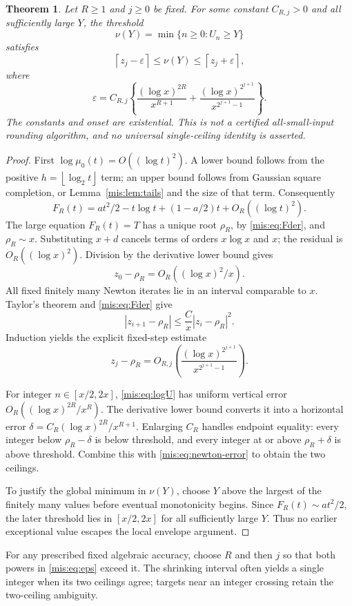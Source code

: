 \documentclass[11pt]{article}
\newtheorem{theorem}{Theorem}[section]
\theoremstyle{remark}\newtheorem{remark}[theorem]{Remark}
\newcommand{\ceil}[1]{\left\lceil #1\right\rceil}
\newcommand{\floor}[1]{\left\lfloor #1\right\rfloor}
\begin{document}
\begin{theorem}\label{mis:thm:inverse}
Let $R\ge1$ and $j\ge0$ be fixed. For some constant $C_{R,j}>0$ and all sufficiently large $Y$, the threshold
\[
 \nu(Y)=\min\{n\ge0:U_n\ge Y\}
\]
satisfies
\begin{equation}\label{mis:eq:ceilings}
 \ceil{z_j-\varepsilon}\le\nu(Y)\le\ceil{z_j+\varepsilon},
\end{equation}
where
\begin{equation}\label{mis:eq:eps}
 \varepsilon=C_{R,j}\left\{
   \frac{(\log x)^{2R}}{x^{R+1}}+
   \frac{(\log x)^{2^{j+1}}}{x^{2^{j+1}-1}}\right\}.
\end{equation}
The constants and onset are existential. This is not a certified all-small-input rounding algorithm, and no universal single-ceiling identity is asserted.
\end{theorem}
\begin{proof}
First $\log\mu_0(t)=O((\log t)^2)$. A lower bound follows from the positive $h=\floor{\log_2t}$ term; an upper bound follows from Gaussian square completion, or Lemma~\ref{mis:lem:tails} and the size of that term. Consequently
\[
 F_R(t)=at^2/2-t\log t+(1-a/2)t+O_R((\log t)^2).
\]
The large equation $F_R(t)=T$ has a unique root $\rho_R$, by \eqref{mis:eq:Fder}, and $\rho_R\sim x$. Substituting $x+d$ cancels terms of orders $x\log x$ and $x$; the residual is $O_R((\log x)^2)$. Division by the derivative lower bound gives
\[
 z_0-\rho_R=O_R((\log x)^2/x).
\]
All fixed finitely many Newton iterates lie in an interval comparable to $x$. Taylor's theorem and \eqref{mis:eq:Fder} give
\[
 |z_{i+1}-\rho_R|\le\frac Cx|z_i-\rho_R|^2.
\]
Induction yields the explicit fixed-step estimate
\begin{equation}\label{mis:eq:newton-error}
 z_j-\rho_R=O_{R,j}\left(
       \frac{(\log x)^{2^{j+1}}}{x^{2^{j+1}-1}}\right).
\end{equation}

For integer $n\in[x/2,2x]$, \eqref{mis:eq:logU} has uniform vertical error $O_R((\log x)^{2R}/x^R)$. The derivative lower bound converts it into a horizontal error
$\delta=C_R(\log x)^{2R}/x^{R+1}$. Enlarging $C_R$ handles endpoint equality: every integer below $\rho_R-\delta$ is below threshold, and every integer at or above $\rho_R+\delta$ is above threshold. Combine this with \eqref{mis:eq:newton-error} to obtain the two ceilings.

To justify the global minimum in $\nu(Y)$, choose $Y$ above the largest of the finitely many values before eventual monotonicity begins. Since $F_R(t)\sim at^2/2$, the later threshold lies in $[x/2,2x]$ for all sufficiently large $Y$. Thus no earlier exceptional value escapes the local envelope argument.
\end{proof}
For any prescribed fixed algebraic accuracy, choose $R$ and then $j$ so that both powers in \eqref{mis:eq:eps} exceed it. The shrinking interval often yields a single integer when its two ceilings agree; targets near an integer crossing retain the two-ceiling ambiguity.
\end{document}
